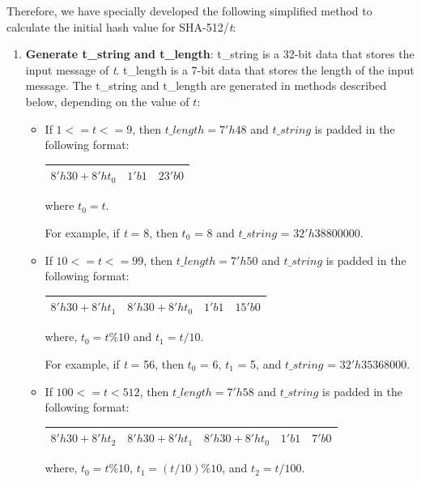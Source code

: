 \documentclass[main\_\_EN.tex]{subfiles}
\begin{document}
Therefore, we have specially developed the following simplified method to calculate the initial hash value for SHA-512/{\it{t}}:

\begin{enumerate}\label{others:sha-512/t}
    \item \textbf{Generate t\_string and t\_length}: t\_string is a 32-bit data that stores the input message of {\it{t}}. t\_length is a 7-bit data that stores the length of the input message. The t\_string and t\_length are generated in methods described below, depending on the value of \begin{math}t\end{math}:

    \begin{itemize}
        \item If $1<=t<=9$, then $t\_length=7'h48$ and $t\_string$ is padded in the following format:\\
        \begin{longtable}[c]{|l|l|l|}
        \hline
        $8'h30+8'ht_0$ & $1'b1$ & $23'b0$\\
        \hline
        \end{longtable}
        where $t_0=t$.

        For example, if {\it{t}} = 8, then $t_0$ = 8 and $t\_string$ = $32'h38800000$.

        \item If $10<=t<=99$, then $t\_length=7'h50$ and $t\_string$ is padded in the following format:\\

        \begin{longtable}[c]{|l|l|l|l|}
        \hline
        $8'h30+8'ht_1$ & $8'h30+8'ht_0$ & $1'b1$ & $15'b0$\\
        \hline
        \end{longtable}
        where, $t_0=t\%10$ and $t_1=t/10$.

        For example, if {\it{t}} = 56, then $t_0$ = 6, $t_1$ = 5, and $t\_string$ = $32'h35368000$.

        \item If $100<=t<512$, then $t\_length=7'h58$ and $t\_string$ is padded in the following format:\\

        \begin{longtable}[c]{|l|l|l|l|l|}
        \hline
        $8'h30+8'ht_2$ & $8'h30+8'ht_1$ & $8'h30+8'ht_0$ & $1'b1$ & $7'b0$\\
        \hline
        \end{longtable}
        where, $t_0=t\%10$, $t_1=(t/10)\%10$, and $t_2=t/100$.


\end{itemize}
\end{enumerate}
\end{document}
